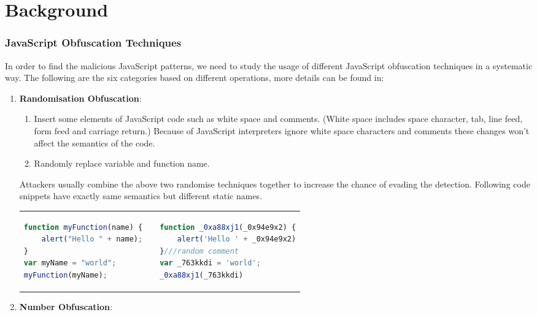 \chapter{Background}
\subsection{JavaScript Obfuscation Techniques}
In order to find the malicious JavaScript patterns, we need to study the usage of different JavaScript obfuscation techniques in a systematic way. The following are the six categories based on different operations, more details can be found in\cite{ObfuscationTechniques}:
\begin{enumerate}
 	\item \textbf{Randomisation Obfuscation}: 
 	\begin{enumerate}
 		\item Insert some elements of JavaScript code such as white space \cite{WhiteSpaceRandomisation} and comments. (White space includes space character, tab, line feed, form feed and carriage return.) Because of JavaScript interpreters ignore white space characters and comments these changes won't affect the semantics of the code.
		\item Randomly replace variable and function name.  
 	\end{enumerate}
 	Attackers usually combine the above two randomise techniques together to increase the chance of evading the detection. Following code snippets have exactly same semantics but different static names.  \\
	\begin{tabular}{p{7cm}p{0.5cm}p{7cm}}
\begin{lstlisting}[language=JavaScript, title=(original code)]
function myFunction(name) {
    alert("Hello " + name);
}
var myName = "world";
myFunction(myName); 
			\end{lstlisting} & & 
			\begin{lstlisting}[language=JavaScript, title=(using randomisation)]
function _0xa88xj1(_0x94e9x2) {
    alert('Hello ' + _0x94e9x2)
}///random comment
var _763kkdi = 'world';
_0xa88xj1(_763kkdi)
			\end{lstlisting}
	\end{tabular} 
 	\item \textbf{Number Obfuscation}:  \\ 

\end{enumerate}
